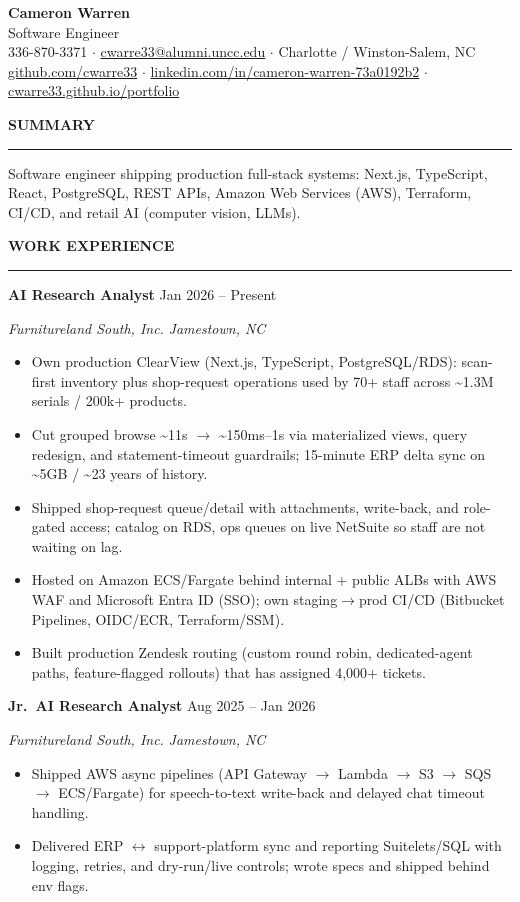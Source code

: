 \documentclass[10pt,letterpaper]{article}
\newcommand{\rsection}[1]{%
  \vspace{5pt}%
  {\normalsize\bfseries\uppercase{#1}}\par\vspace{-0.55em}
  {\color{rulec}\rule{\textwidth}{0.4pt}}\par\vspace{3pt}%
}
\newcommand{\role}[4]{%
  {\bfseries #1} \hfill {\small #4}\par
  {\small\textit{#2}} \hfill {\small\textit{#3}}\par\vspace{1.5pt}%
}
\begin{document}
\color{ink}

\begin{center}
  {\LARGE\bfseries Cameron Warren}\\[1pt]
  {\small Software Engineer}\\[3pt]
  {\footnotesize
    336-870-3371 \;$\cdot$\;
    \href{mailto:cwarre33@alumni.uncc.edu}{cwarre33@alumni.uncc.edu} \;$\cdot$\;
    Charlotte / Winston-Salem, NC}\\[1pt]
  {\footnotesize
    \href{https://github.com/cwarre33}{github.com/cwarre33} \;$\cdot$\;
    \href{https://linkedin.com/in/cameron-warren-73a0192b2}{linkedin.com/in/cameron-warren-73a0192b2} \;$\cdot$\;
    \href{https://cwarre33.github.io/portfolio/}{cwarre33.github.io/portfolio}}
\end{center}

\rsection{Summary}
{\small Software engineer shipping production full-stack systems: Next.js, TypeScript, React, PostgreSQL, REST APIs, Amazon Web Services (AWS), Terraform, CI/CD, and retail AI (computer vision, LLMs).}

\rsection{Work Experience}

\role{AI Research Analyst}{Furnitureland South, Inc.}{Jamestown, NC}{Jan 2026 -- Present}
\begin{itemize}
  \item Own production ClearView (Next.js, TypeScript, PostgreSQL/RDS): scan-first inventory plus shop-request operations used by 70+ staff across {\textasciitilde}1.3M serials / 200k+ products.
  \item Cut grouped browse {\textasciitilde}11s $\rightarrow$ {\textasciitilde}150ms--1s via materialized views, query redesign, and statement-timeout guardrails; 15-minute ERP delta sync on {\textasciitilde}5GB / {\textasciitilde}23 years of history.
  \item Shipped shop-request queue/detail with attachments, write-back, and role-gated access; catalog on RDS, ops queues on live NetSuite so staff are not waiting on lag.
  \item Hosted on Amazon ECS/Fargate behind internal + public ALBs with AWS WAF and Microsoft Entra ID (SSO); own staging$\rightarrow$prod CI/CD (Bitbucket Pipelines, OIDC/ECR, Terraform/SSM).
  \item Built production Zendesk routing (custom round robin, dedicated-agent paths, feature-flagged rollouts) that has assigned 4,000+ tickets.
\end{itemize}

\vspace{3pt}
\role{Jr.\ AI Research Analyst}{Furnitureland South, Inc.}{Jamestown, NC}{Aug 2025 -- Jan 2026}
\begin{itemize}
  \item Shipped AWS async pipelines (API Gateway $\rightarrow$ Lambda $\rightarrow$ S3 $\rightarrow$ SQS $\rightarrow$ ECS/Fargate) for speech-to-text write-back and delayed chat timeout handling.
  \item Delivered ERP $\leftrightarrow$ support-platform sync and reporting Suitelets/SQL with logging, retries, and dry-run/live controls; wrote specs and shipped behind env flags.
\end{itemize}
\end{document}

